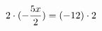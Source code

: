 \documentclass[preview]{standalone}
\begin{document}
\begin{align*}
\special{dvisvgm:raw <g id='unique000'>}2 \cdot (- \frac{5 x}{2}) = (-12) \cdot 2\special{dvisvgm:raw </g>}
\end{align*}
\end{document}
